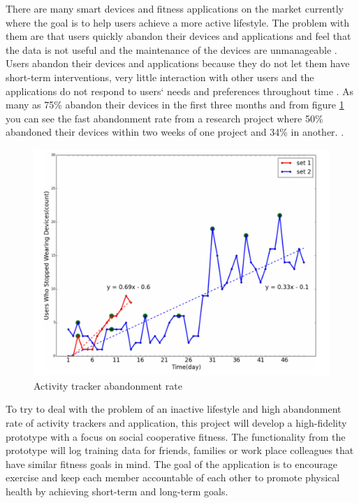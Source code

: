 There are many smart devices and fitness applications on the market currently where the goal is to help users achieve a more active lifestyle. The problem with them are that users quickly abandon their devices and applications and feel that the data is not useful and the maintenance of the devices are unmanageable \cite{Lazar2015}. Users abandon their devices and applications because they do not let them have short-term interventions, very little interaction with other users and the applications do not respond to users` needs and preferences throughout time \cite{Tong} . As many as 75\% abandon their devices in the first three months \cite{Baum} and from figure \ref{acttrack} you can see the fast abandonment rate from a research project where 50\% abandoned their devices within two weeks of one project and 34\% in another. \cite{Lee2017} .
\begin{figure}[H]
    \centering
    \includegraphics[scale=0.50]{figures/trackerAbandonment.png}
    \caption{Activity tracker abandonment rate \cite{Lee2017}}
    \label{acttrack}
\end{figure}

To try to deal with the problem of an inactive lifestyle and high abandonment rate of activity trackers and application, this project will develop a high-fidelity prototype with a focus on social cooperative fitness. The functionality from the prototype will log training data for friends, families or work place colleagues that have similar fitness goals in mind. The goal of the application is to encourage exercise and keep each member accountable of each other to promote physical health by achieving short-term and long-term goals.

